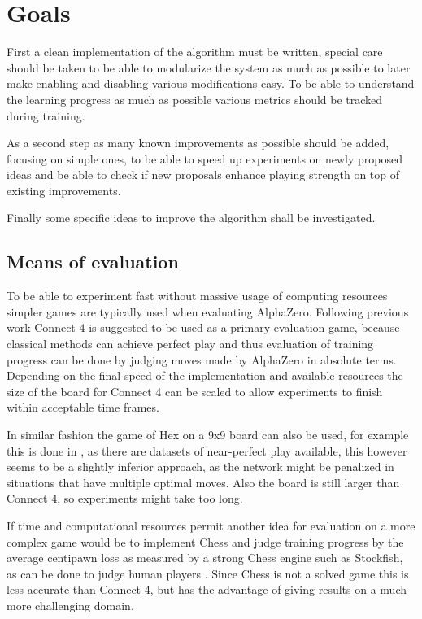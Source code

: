 \documentclass[12pt,onecolumn,oneside,titlepage]{article}
\begin{document}
\section{Goals}

First a clean implementation of the algorithm must be written, special care should be taken to be able to modularize the system as much as possible to later make enabling and disabling various modifications easy.
To be able to understand the learning progress as much as possible various metrics should be tracked during training.

As a second step as many known improvements as possible should be added, focusing on simple ones, to be able to speed up experiments on newly proposed ideas and be able to check if new proposals enhance playing strength on top of existing improvements.

Finally some specific ideas to improve the algorithm shall be investigated.


\subsection{Means of evaluation}

To be able to experiment fast without massive usage of computing resources simpler games are typically used when evaluating AlphaZero.
Following previous work \cite{oracledevs} Connect 4 is suggested to be used as a primary evaluation game, because classical methods can achieve perfect play and thus evaluation of training progress can be done by judging moves made by AlphaZero in absolute terms.
Depending on the final speed of the implementation and available resources the size of the board for Connect 4 can be scaled to allow experiments to finish within acceptable time frames.

In similar fashion the game of Hex on a 9x9 board can also be used, for example this is done in \cite{anonymous2020threehead}, as there are datasets of near-perfect play available, this however seems to be a slightly inferior approach, as the network might be penalized
in situations that have multiple optimal moves. Also the board is still larger than Connect 4, so experiments might take too long.

If time and computational resources permit another idea for evaluation on a more complex game would be to implement Chess and judge training progress by the average centipawn loss as measured by a strong Chess engine such as Stockfish, as can be done to judge human players \cite{guid2011using}.
Since Chess is not a solved game this is less accurate than Connect 4, but has the advantage of giving results on a much more challenging domain.
\end{document}
